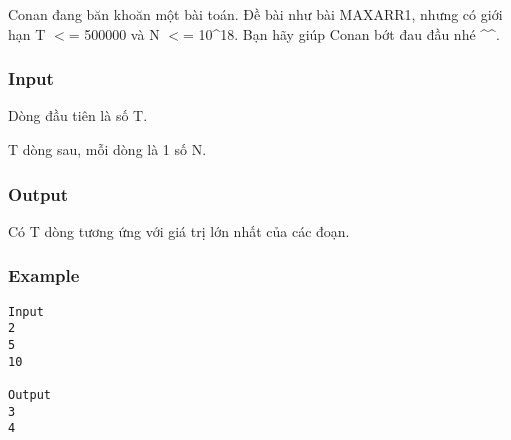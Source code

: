 



   Conan đang băn khoăn một bài toán. Đề bài như bài MAXARR1, nhưng có giới hạn T $<$= 500000 và N $<$= 10\textasciicircum18. Bạn hãy giúp Conan bớt đau đầu nhé \textasciicircum\textasciicircum.  

\subsubsection{   Input  }

   Dòng đầu tiên là số T.  

   T dòng sau, mỗi dòng là 1 số N.  

\subsubsection{   Output  }

   Có T dòng tương ứng với giá trị lớn nhất của các đoạn.  

\subsubsection{   Example  }
\begin{verbatim}
Input
2
5
10

Output
3
4
\end{verbatim}